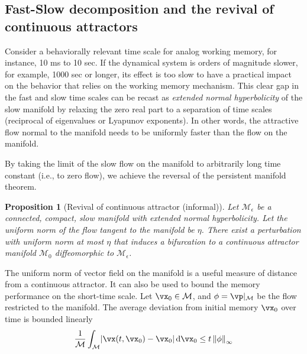 \documentclass{article} %
\newcounter{ct}
\newcommand{\dm}[1]{\ensuremath{\mathrm{d}{#1}}} %
\newcommand{\manifold}{\mathcal{M}}
\newcommand{\uniformNorm}[1]{\left\|#1\right\|_\infty} %
\DeclarePairedDelimiter{\abs}{\lvert}{\rvert}
\newtheorem{prop}{Proposition}
\theoremstyle{definition}
\theoremstyle{remark}
\begin{document}
\subsection{Fast-Slow decomposition and the revival of continuous attractors}\label{sec:revival}
Consider a behaviorally relevant time scale for analog working memory, for instance, 10 ms to 10 sec.
If the dynamical system is orders of magnitude slower, for example, 1000 sec or longer, its effect is too slow to have a practical impact on the behavior that relies on the working memory mechanism.
This clear gap in the fast and slow time scales can be recast as \emph{extended normal hyperbolicity} of the slow manifold by relaxing the zero real part to a separation of time scales (reciprocal of eigenvalues or Lyapunov exponents).
In other words, the attractive flow normal to the manifold needs to be uniformly faster than the flow on the manifold.

By taking the limit of the slow flow on the manifold to arbitrarily long time constant (i.e., to zero flow), we achieve the reversal of the persistent manifold theorem.
\begin{prop}[Revival of continuous attractor (informal)]\label{prop:revival}
Let $\manifold_\epsilon$ be a connected, compact, slow manifold with extended normal hyperbolicity. %
Let the uniform norm of the flow tangent to the manifold be $\eta$.
There exist a perturbation with uniform norm at most $\eta$ that induces a bifurcation to a continuous attractor manifold $\manifold_0$ diffeomorphic to $\manifold_\epsilon$.
\end{prop}

The uniform norm of vector field on the manifold is a useful measure of distance from a continuous attractor.
It can also be used to bound the memory performance on the short-time scale. %
Let $\vx_0 \in \manifold$, and $\phi = \vp\vert_\manifold$ be the flow restricted to the manifold.
The average deviation from initial memory $\vx_0$ over time is bounded linearly
\begin{align}\label{eq:distance:ub}
\frac{1}{\manifold}\int_\manifold
\abs{\vx(t, \vx_0) - \vx_0}\,
\dm{\vx_0}
\leq t\uniformNorm{\phi}
\end{align}
\end{document}
